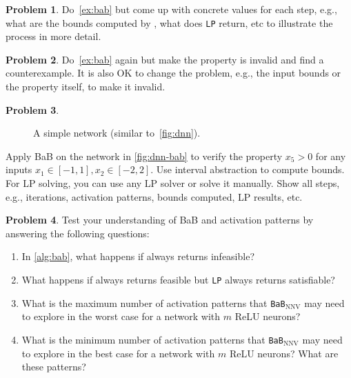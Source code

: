 \documentclass[oneside,11pt,dvipsnames]{book}
\numberwithin{equation}{section}
\theoremstyle{definition}
\newtheorem{problem}{Problem}[section]
\theoremstyle{remark}
\newcommand{\mycode}[1]{\textrm{\texttt{#1}}}
\newcommand{\bab}{\texttt{BaB$_{\text{NNV}}$}}
\begin{document}
\begin{problem}\label{prob:bab-detailed}
Do~\autoref{ex:bab} but come up with concrete values for each step, e.g., what are the bounds computed by \Deduce, what does \mycode{LP} return, etc to illustrate the process in more detail.
\end{problem}


\begin{problem}\label{prob:bab-counterexample}
Do~\autoref{ex:bab} again but make the property is invalid and find a counterexample. It is also OK to change the problem, e.g., the input bounds or the property itself, to make it invalid.
\end{problem}


\begin{problem}\label{prob:bab-interval}
\begin{figure}
\centering
{}
\caption{\label{fig:dnn-bab}A simple network (similar to~\autoref{fig:dnn}).}
\end{figure}

Apply BaB on the network in \autoref{fig:dnn-bab} to verify the property $x_5 > 0$ for any inputs $x_1 \in [-1,1], x_2\in[-2,2]$.  Use interval abstraction to compute bounds. For LP solving, you can use any LP solver or solve it manually. Show all steps, e.g., iterations, activation patterns, bounds computed, LP results, etc.

\end{problem}


\begin{problem}\label{prob:bab-understanding}
Test your understanding of BaB and activation patterns by answering the following questions:
\begin{enumerate}

  \item In \autoref{alg:bab}, what happens if \Deduce always returns infeasible?
  \item What happens if \Deduce always returns feasible but \mycode{LP} always returns satisfiable?
  \item What is the maximum number of activation patterns that \bab{} may need to explore in the worst case for a network with $m$ ReLU neurons?
  \item What is the minimum number of activation patterns that \bab{} may need to explore in the best case for a network with $m$ ReLU neurons? What are these patterns?
\end{enumerate}
\end{problem}
\end{document}
